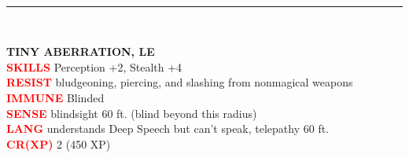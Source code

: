 \documentclass{article}
\begin{document}
\begin{adjustbox}{minipage=0.45\textwidth, margin=\fboxsep, bgimage=../images/texture2.pdf}
{\begin{minipage}[t][10.5in][t]{0.9\textwidth}
\begin{minipage}[t]{0.7\textwidth}
        \end{minipage}
        \vspace{0.025in}\\
        \rule{\textwidth}{1pt}\\
        \vspace{-0.08in}
        \begin{flushleft}
            {\large\textbf{TINY ABERRATION, LE}}\\
            \textcolor{red}{\textbf{SKILLS}}  Perception +2, Stealth +4 \\
            \textcolor{red}{\textbf{RESIST}} bludgeoning, piercing, and slashing from nonmagical weapons\\
            \textcolor{red}{\textbf{IMMUNE}} Blinded\\
            \textcolor{red}{\textbf{SENSE}} blindsight 60 ft. (blind beyond this radius)\\
            \textcolor{red}{\textbf{LANG}}  understands Deep Speech but can't speak, telepathy 60 ft.\\
            \textcolor{red}{\textbf{CR(XP)}}  2 (450 XP)\\
        \end{flushleft}
        \end{minipage}
	}
\end{adjustbox}


\pagebreak
\end{document}

